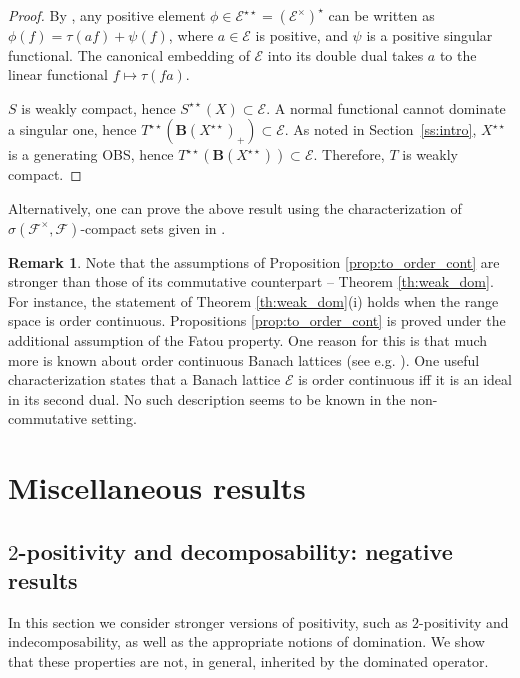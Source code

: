 \documentclass[12pt]{amsart}
\theoremstyle{plain}
\theoremstyle{definition}
\newtheorem{remark}[theorem]{Remark}
\newcommand{\ce}{\mathcal E}
\newcommand{\ball}{\mathbf{B}}
\begin{document}
\begin{proof}
By \cite[Section 5]{DDdP93}, any positive element
$\phi \in \ce^{\star\star} = (\ce^\times)^\star$ can be written as
$\phi(f) = \tau(a f) + \psi(f)$, where $a \in \ce$ is positive,
and $\psi$ is a positive singular functional. The canonical
embedding of $\ce$ into its double dual takes $a$ to the
linear functional $f \mapsto \tau(fa)$.

$S$ is weakly compact, hence $S^{\star\star}(X) \subset \ce$.
A normal functional cannot dominate a singular one,
hence $T^{\star\star}(\ball(X^{\star\star})_+) \subset \ce$.
As noted in Section~\ref{ss:intro}, $X^{\star\star}$ is a generating OBS,
hence $T^{\star\star}(\ball(X^{\star\star})) \subset \ce$.
Therefore, $T$ is weakly compact.
\end{proof}

Alternatively, one can prove the above result using the characterization of
$\sigma({\mathcal{F}}^\times,{\mathcal{F}})$-compact sets given in
\cite[Proposition 6.2]{DdP09}.

\begin{remark}\label{rem:ord_cont}
Note that the assumptions of Proposition \ref{prop:to_order_cont}
are stronger than those of its commutative counterpart --
Theorem \ref{th:weak_dom}. For instance, the statement of
Theorem \ref{th:weak_dom}(i) holds when the range space is
order continuous. Propositions \ref{prop:to_order_cont} is
proved under the additional assumption of the Fatou property.
One reason for this is that much more is known about order
continuous Banach lattices (see e.g. \cite[Section 2.4]{M-N}).
One useful characterization states that a Banach lattice $\ce$
is order continuous iff it is an ideal in its second dual.
No such description seems to be known in the non-commutative setting.
\end{remark}


\section{Miscellaneous results}\label{sec:misc}

\subsection{$2$-positivity and decomposability: negative results}\label{ss:positive}

In this section we consider stronger versions of positivity,
such as $2$-positivity and indecomposability, as well as
the appropriate notions of domination. We show that these properties
are not, in general, inherited by the dominated operator.
\end{document}
